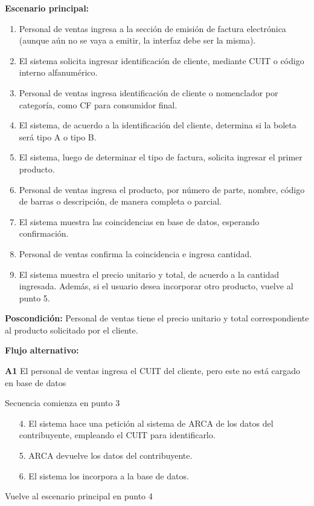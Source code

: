 \textbf{Escenario principal:}
\begin{enumerate}
	\item Personal de ventas ingresa a la sección de emisión de factura electrónica (aunque aún no se vaya a emitir, la interfaz debe ser la misma).
	\item El sistema solicita ingresar identificación de cliente, mediante CUIT o código interno alfanumérico.
	\item Personal de ventas ingresa identificación de cliente o nomenclador por categoría, como CF para consumidor final.
	\item El sistema, de acuerdo a la identificación del cliente, determina si la boleta será tipo A o tipo B.
	\item El sistema, luego de determinar el tipo de factura, solicita ingresar el primer producto.
	\item Personal de ventas ingresa el producto, por número de parte, nombre, código de barras o descripción, de manera completa o parcial.
	\item El sistema muestra las coincidencias en base de datos, esperando confirmación.
	\item Personal de ventas confirma la coincidencia e ingresa cantidad.
	\item El sistema muestra el precio unitario y total, de acuerdo a la cantidad ingresada.
	Además, si el usuario desea incorporar otro producto, vuelve al punto 5.
\end{enumerate}

\textbf{Poscondición:}
Personal de ventas tiene el precio unitario y total correspondiente al producto solicitado por el cliente.

\textbf{Flujo alternativo:}

\textbf{A1} El personal de ventas ingresa el CUIT del cliente, pero este no está cargado en base de datos

Secuencia comienza en punto 3

\begin{enumerate}
	\item[4.] El sistema hace una petición al sistema de ARCA de los datos del contribuyente, 
	empleando el CUIT para identificarlo.
	\item[5.] ARCA devuelve los datos del contribuyente.
	\item[6.] El sistema los incorpora a la base de datos.
\end{enumerate}

Vuelve al escenario principal en punto 4

